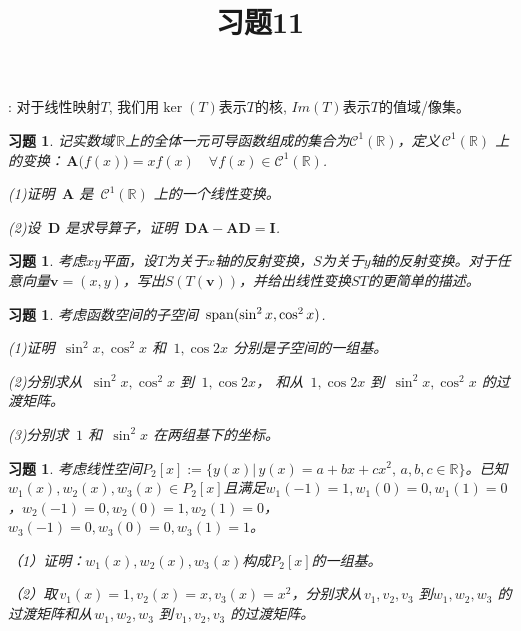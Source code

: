 \documentclass[UTF8]{ctexart}
\newtheorem{ex}[thm]{习题}
\begin{document}
\title{习题11}

\date{}

\maketitle

\vspace{-1cm}





: 对于线性映射$T$, 我们用$\ker(T)$表示$T$的核, $Im (T)$表示$T$的值域/像集。

\medskip


\begin{ex}
	记实数域$\,\mathbb{R}$上的全体一元可导函数组成的集合为$\mathcal{C}^1(\mathbb{R})$，定义$\,\mathcal{C}^1(\mathbb{R})$ 上的变换：$\,\boldsymbol{A}\big(f(x)\big) = xf(x) \quad \forall f(x) \in \mathcal{C}^1(\mathbb{R})$.
	
	(1)证明 $\,\boldsymbol{A}$ 是 $\,\mathcal{C}^1(\mathbb{R})$ 上的一个线性变换。
	
	(2)设 $\,\boldsymbol{D}$ 是求导算子，证明 $\,\boldsymbol{D}\boldsymbol{A} - \boldsymbol{A}\boldsymbol{D} = \boldsymbol{I}$.
\end{ex}


\begin{ex}
	考虑$xy$平面，设$T$为关于$x$轴的反射变换，$S$为关于$y$轴的反射变换。对于任意向量$\mathbf{v}=(x,y)$，写出$S(T(\mathbf{v}))$，并给出线性变换$ST$的更简单的描述。
\end{ex}


\begin{ex}
	考虑函数空间的子空间 $\,{\rm span}(\sin^2x, \cos^2x)$.
	
	(1)证明 $\,\sin^2x, \cos^2 x$ 和 $\,1, \cos 2x$ 分别是子空间的一组基。
	
	(2)分别求从 $\,\sin^2x, \cos^2 x$ 到 $\,1, \cos 2x$， 和从 $\,1, \cos 2x$ 到 $\,\sin^2x, \cos^2 x$ 的过渡矩阵。
	
	(3)分别求 $\,1$ 和 $\,\sin^2 x$ 在两组基下的坐标。
\end{ex}



\begin{ex}
	考虑线性空间$P_2[x]:=\{y(x)|\, y(x)=a+bx+cx^2,\,a,b,c\in \mathbb{R}\}$。已知$w_1(x), w_2(x), w_3(x)\in P_2[x]$且满足$w_1(-1)=1, w_1(0)=0, w_1(1)=0$，$w_2(-1)=0, w_2(0)=1, w_2(1)=0$，$w_3(-1)=0, w_3(0)=0, w_3(1)=1$。
	
	（1）证明：$w_1(x), w_2(x), w_3(x)$构成$P_2[x]$的一组基。
	
	（2）取$\,v_1(x)=1, v_2(x)=x, v_3(x)=x^2$，分别求从$\,v_1,v_2,v_3$ 到$w_1, w_2, w_3$ 的过渡矩阵和从$\,w_1, w_2, w_3$ 到$\,v_1,v_2,v_3$ 的过渡矩阵。
\end{ex}
\end{document}
